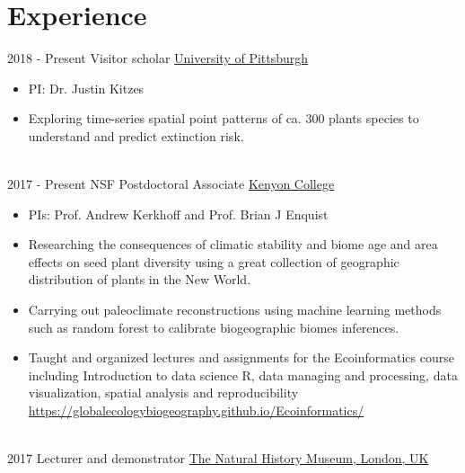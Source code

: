 \documentclass[letterpaper]{twentysecondcv} %
\begin{document}
\makeprofile %


\section{Experience}

\begin{twenty} %
\twentyitem
    	{2018 -}
		{Present}
        {Visitor scholar}
        {\href{https://www.biology.pitt.edu/}{University of Pittsburgh}}
        {}
        {\begin{itemize}
        \item PI: Dr. Justin Kitzes
        \item Exploring time-series spatial point patterns of ca. 300 plants species to understand and predict extinction risk. 
        \end{itemize}}
        \\
	\twentyitem
    	{2017 -}
		{Present}
        {NSF Postdoctoral Associate}
        {\href{https://www.kenyon.edu}{Kenyon College}}
        {}
        {
        {\begin{itemize}
        \item PIs: Prof. Andrew Kerkhoff and Prof. Brian J Enquist
        \item Researching the consequences of climatic stability and biome age and area effects on seed plant diversity using a great collection of geographic distribution of plants in the New World. 
        \item Carrying out paleoclimate reconstructions using machine learning methods such as random forest to calibrate biogeographic biomes inferences. 
       	\item Taught and organized lectures and assignments for the Ecoinformatics course including Introduction to data science R, data managing and processing, data visualization, spatial analysis and reproducibility \url{https://globalecologybiogeography.github.io/Ecoinformatics/}
    \end{itemize}}
        }
    \\   
     \twentyitem
   		{2017}
		{}
        {Lecturer and demonstrator}
        {\href{http://www.nhm.ac.uk/}{The Natural History Museum, London, UK}}
        {}
        {
        {\begin{itemize}

\end{itemize}}}
\end{twenty}
\end{document}
